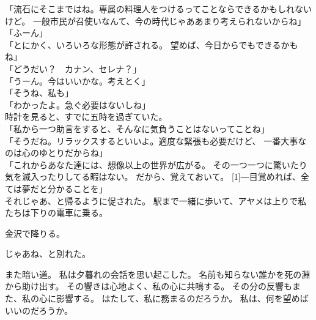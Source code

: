\documentclass[../IHMain]{subfiles}
\begin{document}
「流石にそこまではね。専属の料理人をつけるってことならできるかもしれないけど。
一般市民が召使いなんて、今の時代じゃああまり考えられないからね」\\
「ふーん」\\
「とにかく、いろいろな形態が許される。
望めば、今日からでもできるかもね」\\
「どうだい？　カナン、セレナ？」\\
「うーん。今はいいかな。考えとく」\\
「そうね、私も」\\
「わかったよ。急ぐ必要はないしね」\\
時計を見ると、すでに五時を過ぎていた。\\
「私から一つ助言をすると、そんなに気負うことはないってことね」\\
「そうだね。リラックスするといいよ。適度な緊張も必要だけど、
一番大事なのは心のゆとりだからね」\\
「これからあなた達には、想像以上の世界が広がる。
その一つ一つに驚いたり気を滅入ったりしてる暇はない。
だから、覚えておいて。
\scalebox{3}[1]{―}目覚めれば、全ては夢だと分かることを」\\


それじゃあ、と帰るように促された。
駅まで一緒に歩いて、アヤメは上りで私たちは下りの電車に乗る。

金沢で降りる。

じゃあね、と別れた。

また暗い道。
私は夕暮れの会話を思い起こした。
名前も知らない誰かを死の淵から助け出す。
その響きは心地よく、私の心に共鳴する。
その分の反響もまた、私の心に影響する。
はたして、私に務まるのだろうか。
私は、何を望めばいいのだろうか。
\end{document}
